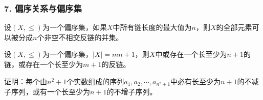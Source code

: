 \documentclass{beamer}
\begin{document}
\begin{CJK*}{UTF8}{gbsn}
\begin{frame}
  \frametitle{7. 偏序关系与偏序集}
  \begin{Thm}
    设$(X,\leq)$为一个偏序集，如果$X$中所有链长度的最大值为$n$，则$X$的全部元素可以被分成$n$个非空不相交反链的并集。
  \end{Thm}\pause
  \begin{Cor}
    设$(X,\leq)$为一个偏序集，$|X|=mn+1$，则$X$中或存在一个长至少为$n+1$的链，或存在一个长至少为$m+1$的反链。
  \end{Cor}\pause
  \begin{Ex}
    证明：每个由$n^2+1$个实数组成的序列$a_1,a_2,\cdots,a_{n^2+1}$中必有长至少为$n+1$的不减子序列，或有一个长至少为$n+1$的不增子序列。
  \end{Ex}
\end{frame}
   

\end{CJK*}
\end{document}
